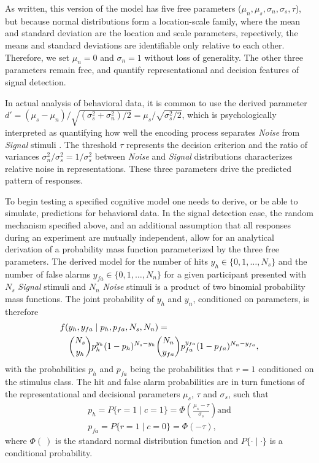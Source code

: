 \documentclass[12pt]{report}
\begin{document}
As written, this version of the model has five free
parameters ($\mu_n,\mu_s,\sigma_n,\sigma_s,\tau$), but
because normal distributions form a location-scale family, where the
mean and standard deviation are the location and scale parameters,
repectively, the means and standard deviations are identifiable only
relative to each other.  Therefore, we set $\mu_n = 0$ and $\sigma_n = 1$
without loss of generality. The other three parameters remain free,
and quantify representational and decision features of signal detection.

In actual analysis of behavioral data, it is common to use the derived parameter $d' = (\mu_s - \mu_n)/\sqrt{(\sigma_s^2 + \sigma_n^2) / 2} = \mu_s/\sqrt{\sigma_s^2 / 2}$, which is psychologically interpreted as quantifying how well
the encoding process separates \textit{Noise} from \textit{Signal} stimuli \citep{MacCre2004}. 
The threshold
$\tau$ represents the decision criterion
%
and the ratio of variances
$\sigma_n^2/\sigma_s^2 = 1/\sigma_s^2$ between \textit{Noise}
and \textit{Signal} distributions characterizes relative noise in
representations. These three parameters drive the predicted pattern of
responses.
    
To begin testing a specified cognitive model one needs to derive, or be
able to simulate, predictions for behavioral data. In the signal detection
case, the random mechanism specified above, and an additional assumption
that all responses during an experiment are mutually independent, allow for
an analytical derivation of a probability mass function parameterized by
the three free parameters.  The derived model for the number of hits
$y_h \in \{0, 1, \ldots, N_s\}$ and the number of false alarms $y_{fa} \in
\{0, 1, \ldots, N_n\}$ for a given participant presented with $N_s$
\textit{Signal} stimuli and $N_n$ \textit{Noise} stimuli is a product of two binomial probability mass
functions. The joint probability of $y_h$ and $y_n$, conditioned on parameters, is therefore
%
\begin{eqnarray}
\lefteqn{f(y_h, y_{fa} \mid p_h, p_{fa}, N_s, N_n) = }\nonumber \\
& & \binom{N_s}{y_h}p_h^{y_h}(1 - p_{h})^{N_s - y_h}
\binom{N_n}{y_{fa}}p_{fa}^{y_{fa}}(1 - p_{fa})^{N_n - y_{fa}},
\end{eqnarray}
%
with the probabilities $p_h$ and $p_{fa}$ being the probabilities
that $r=1$ conditioned on the stimulus class.  The hit and false alarm probabilities are in
turn functions of the representational and decisional parameters $\mu_s$, $\tau$ and $\sigma_s$, such that
%
\begin{align}
p_h = P\{r = 1 \mid c = 1\} = \Phi\left(\frac{\mu_s - \tau}{\sigma_s}\right) \text{and} \nonumber \\
p_{fa} = P\{r = 1 \mid c = 0\} = \Phi \left(-\tau\right),
\end{align}
where $\Phi(\:)$ is the standard normal distribution function and $P\{\cdot \mid \cdot\}$ is a conditional probability.
    
\end{document}
